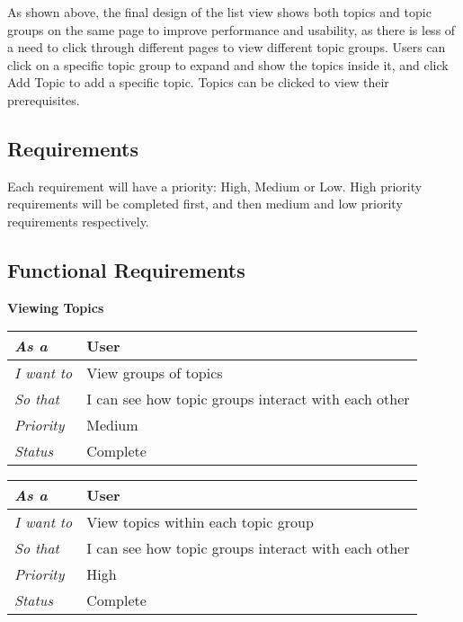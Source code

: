 As shown above, the final design of the list view shows both topics and topic groups on the same page to improve performance and usability, as there is less of a need to click through different pages to view different topic groups. Users can click on a specific topic group to expand and show the topics inside it, and click Add Topic to add a specific topic. Topics can be clicked to view their prerequisites.

\subsection{Requirements}
Each requirement will have a priority: High, Medium or Low. High priority requirements will be completed first, and then medium and low priority requirements respectively. \\

\subsection{Functional Requirements}

\textbf{Viewing Topics}

\begin{table}[hp]
\begin{tabular}{ll}
\textit{As a}      & User                                                \\ \hline
\textit{I want to} & View groups of topics                               \\ \hline
\textit{So that}   & I can see how topic groups interact with each other \\ \hline
\textit{Priority}  & {\color[HTML]{FE996B} Medium}                         \\ \hline
\textit{Status}    & Complete                                            \\ \hline
\end{tabular}
\end{table}

\begin{table}[hp]
\begin{tabular}{ll}
\textit{As a}      & User                                                \\ \hline
\textit{I want to} & View topics within each topic group                 \\ \hline
\textit{So that}   & I can see how topic groups interact with each other \\ \hline
\textit{Priority}  & {\color[HTML]{FE0000} High}                         \\ \hline
\textit{Status}    & Complete                                            \\ \hline
\end{tabular}
\end{table}

